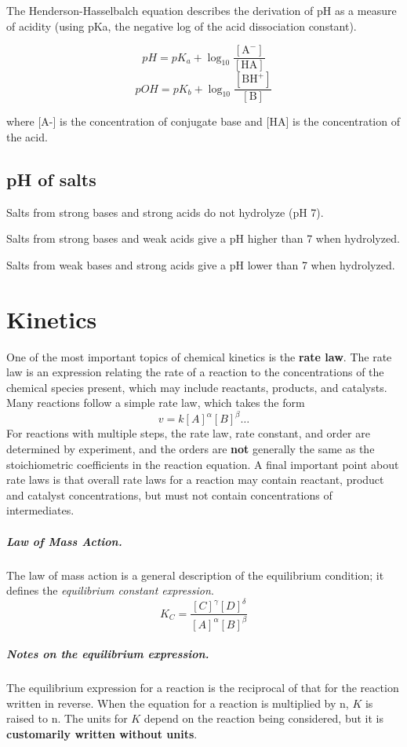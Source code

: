 \documentclass[oneside]{book} %
\theoremstyle{plain}
\begin{document}
The Henderson-Hasselbalch equation describes the derivation of pH as a
measure of acidity (using pKa, the negative log of the acid dissociation
constant).

\[pH = pK_a + \log_{10} \frac{[\text{A}^-]}{[\text{HA}]}\]
\[pOH = pK_b + \log_{10} \frac{[\text{BH}^+]}{[\text{B}]}\]

where [A-] is the concentration of conjugate base and [HA] is the concentration
of the acid.

\section{pH of salts}
Salts from strong bases and strong acids do not hydrolyze (pH 7).

Salts from strong bases and weak acids give a pH higher than 7 when hydrolyzed.

Salts from weak bases and strong acids give a pH lower than 7 when hydrolyzed.

\chapter{Kinetics}

One of the most important topics of chemical kinetics is the \textbf{rate law}.
The rate law is an expression relating the rate of a reaction to the
concentrations of the chemical species present, which may include reactants,
products, and catalysts. Many reactions follow a simple rate law, which takes
the form
\[v = k [A]^\alpha [B]^\beta \ldots\]
For reactions with multiple steps, the rate law, rate constant, and order are
determined by experiment, and the orders are \textbf{not} generally the same as
the stoichiometric coefficients in the reaction equation.  A final important
point about rate laws is that overall rate laws for a reaction may contain
reactant, product and catalyst concentrations, but must not contain
concentrations of intermediates.

\paragraph{Law of Mass Action.} The law of mass action is a general description
of the equilibrium condition; it defines the \textit{equilibrium constant
expression}.
\[K_C = \frac{[C]^\gamma [D]^\delta}{[A]^\alpha [B]^\beta}\]

\paragraph{Notes on the equilibrium expression.} The equilibrium expression for
a reaction is the reciprocal of that for the reaction written in reverse. When
the equation for a reaction is multiplied by n, \(K\) is raised to n.  The
units for \(K\) depend on the reaction being considered, but it is
\textbf{customarily written without units}.
\end{document}
